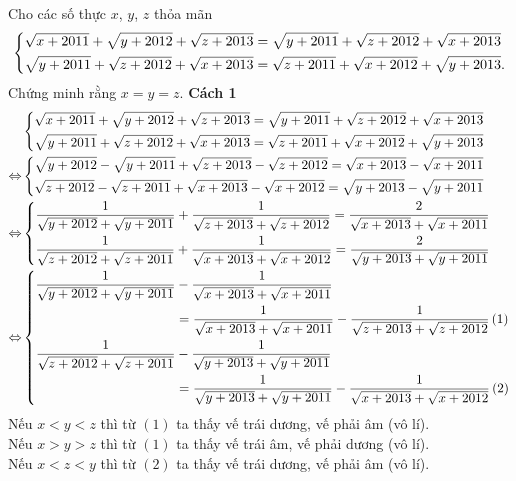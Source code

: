 \begin{ex}%
 Cho các số thực $x$, $y$, $z$ thỏa mãn
 \begin{align*}
  \left\{\begin{aligned}& \sqrt{x + 2011} + \sqrt{y + 2012} + \sqrt{z + 2013} = \sqrt{y + 2011} + \sqrt{z + 2012} + \sqrt{x + 2013} \\& \sqrt{y + 2011} + \sqrt{z + 2012} + \sqrt{x + 2013} = \sqrt{z + 2011} + \sqrt{x + 2012} + \sqrt{y + 2013}.\end{aligned}\right.
 \end{align*}
 Chứng minh rằng $x = y = z$.
 \loigiai
  {
  \textbf{Cách 1}
  \begin{align*}
   				   & \left\{\begin{aligned}& \sqrt{x + 2011} + \sqrt{y + 2012} + \sqrt{z + 2013} = \sqrt{y + 2011} + \sqrt{z + 2012} + \sqrt{x + 2013} \\& \sqrt{y + 2011} + \sqrt{z + 2012} + \sqrt{x + 2013} = \sqrt{z + 2011} + \sqrt{x + 2012} + \sqrt{y + 2013}\end{aligned}\right.\\
   \Leftrightarrow & \left\{\begin{aligned}& \sqrt{y + 2012} - \sqrt{y + 2011} + \sqrt{z + 2013} - \sqrt{z + 2012} = \sqrt{x + 2013} - \sqrt{x + 2011} \\& \sqrt{z + 2012} - \sqrt{z + 2011} + \sqrt{x + 2013} - \sqrt{x + 2012} = \sqrt{y + 2013} - \sqrt{y + 2011}\end{aligned}\right. \\
   \Leftrightarrow & \left\{\begin{aligned}& \dfrac{1}{\sqrt{y + 2012} + \sqrt{y + 2011}} + \dfrac{1}{\sqrt{z + 2013} + \sqrt{z + 2012}} = \dfrac{2}{\sqrt{x + 2013} + \sqrt{x + 2011}} \\& \dfrac{1}{\sqrt{z + 2012} + \sqrt{z + 2011}} + \dfrac{1}{\sqrt{x + 2013} + \sqrt{x + 2012}} = \dfrac{2}{\sqrt{y + 2013} + \sqrt{y + 2011}}\end{aligned}\right. \\
   \Leftrightarrow & \left\{\begin{aligned} \dfrac{1}{\sqrt{y + 2012} + \sqrt{y + 2011}} &- \dfrac{1}{\sqrt{x + 2013} + \sqrt{x + 2011}} \\&= \dfrac{1}{\sqrt{x + 2013} + \sqrt{x + 2011}} - \dfrac{1}{\sqrt{z + 2013} + \sqrt{z + 2012}} \, (1) \\ \dfrac{1}{\sqrt{z + 2012} + \sqrt{z + 2011}} &- \dfrac{1}{\sqrt{y + 2013} + \sqrt{y + 2011}} \\&= \dfrac{1}{\sqrt{y + 2013} + \sqrt{y + 2011}} - \dfrac{1}{\sqrt{x + 2013} + \sqrt{x + 2012}} \, (2)\end{aligned}\right.
  \end{align*}
  Nếu $x < y < z$ thì từ $(1)$ ta thấy vế trái dương, vế phải âm (vô lí).\\
  Nếu $x > y > z$ thì từ $(1)$ ta thấy vế trái âm, vế phải dương (vô lí).\\
  Nếu $x < z < y$ thì từ $(2)$ ta thấy vế trái dương, vế phải âm (vô lí).\\
}
\end{ex}
